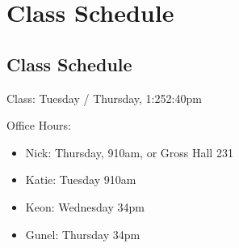 \documentclass[letterpaper,10pt,english]{jupyterBook}
\begin{document}
\sphinxstepscope


\part{Class Schedule}

\sphinxstepscope


\chapter{Class Schedule}
\label{\detokenize{00_class_schedule/class_schedule:class-schedule}}\label{\detokenize{00_class_schedule/class_schedule::doc}}
\sphinxAtStartPar
Class: Tuesday / Thursday, 1:25\sphinxhyphen{}2:40pm

\sphinxAtStartPar
Office Hours:
\begin{itemize}
\item {} 
\sphinxAtStartPar
Nick: Thursday, 9\sphinxhyphen{}10am,  or Gross Hall 231

\item {} 
\sphinxAtStartPar
Katie: Tuesday 9\sphinxhyphen{}10am 

\item {} 
\sphinxAtStartPar
Keon: Wednesday 3\sphinxhyphen{}4pm 

\item {} 
\sphinxAtStartPar
Gunel: Thursday 3\sphinxhyphen{}4pm 

\end{itemize}
\end{document}
